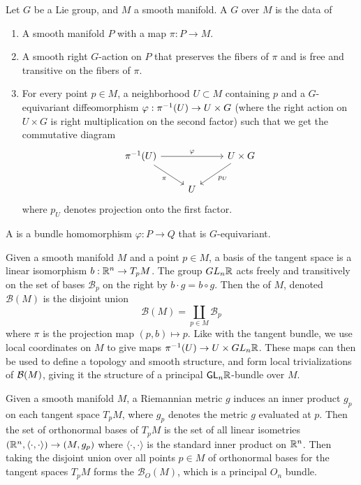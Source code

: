 %
\begin{defn}
Let $G$ be a Lie group, and $M$ a smooth manifold. A  $G$
over $M$ is the data of
%
\begin{enumerate}
  \item A smooth manifold $P$ with a map $\pi : P \to M$.
  \item A smooth right $G$-action on $P$ that preserves the fibers of $\pi$ and
  is free and transitive on the fibers of $\pi$.
  \item For every point $p \in M$, a neighborhood $U \subset M$ containing $p$ and
  a $G$-equivariant diffeomorphism $\varphi: \pi^{-1}(U) \to U \times G$ (where
  the right action on $U \times G$ is right multiplication on the second factor)
  such that we get the commutative diagram
  \[\begin{tikzcd}
  \pi\inv(U) \ar[dr, "\pi"']\ar[rr, "\varphi"]&& U \times G \ar[dl, "p_U"]\\
  & U
  \end{tikzcd}\]
  where $p_U$ denotes projection onto the first factor.
\end{enumerate}
A  is a bundle homomorphism $\varphi : P \to Q$
that is $G$-equivariant.
\end{defn}
%
\begin{exmp}
Given a smooth manifold $M$ and a point $p \in M$, a basis of the
tangent space is a linear isomorphism $b : \mathbb{R}^n \to T_pM$. The group
$GL_n\mathbb{R}$ acts freely and transitively on the set of bases $\mathcal{B}_p$ on the right by
$b \cdot g = b \circ g$. Then the  of $M$, denoted
$\mathcal{B}(M)$ is the disjoint union
\[
\mathcal{B}(M) = \coprod_{p \in M}\mathcal{B}_p
\]
where $\pi$ is the projection map $(p,b) \mapsto p$. Like with the tangent
bundle, we use local coordinates on $M$ to give maps $\pi^{-1}(U) \to U \times GL_n\mathbb{R}$.
These maps can then be used to define a topology and smooth structure, and
form local trivializations of $\mathcal{B}(M)$, giving it the structure of a principal
$\mathsf{GL}_n\mathbb{R}$-bundle over $M$.
\end{exmp}
%
\begin{exmp}
Given a smooth manifold $M$, a Riemannian metric $g$ induces an inner product
$g_p$ on each tangent space $T_pM$, where $g_p$ denotes the metric $g$ evaluated
at $p$. Then the set of orthonormal bases of $T_pM$ is the
set of all linear isometries $(\mathbb{R}^n, \langle\cdot,\cdot\rangle) \to (M, g_p)$
where $\langle\cdot,\cdot\rangle$ is the standard inner product on $\mathbb{R}^n$.
Then taking the disjoint union over all points $p\in M$ of orthonormal bases
for the tangent spaces $T_pM$ forms the 
$\mathcal{B}_O(M)$, which is a principal $O_n$ bundle.
\end{exmp}
